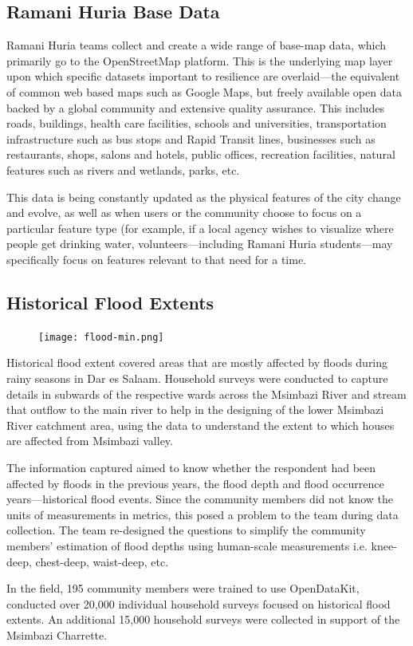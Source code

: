 \documentclass[a4paper,12pt,twoside]{article}
\begin{document}
\subsection{Ramani Huria Base Data}
\begin{multicols}{2}
Ramani Huria teams collect and create a wide range of base-map data, which primarily go to the OpenStreetMap platform. This is the underlying map layer upon which specific datasets important to resilience are overlaid—the equivalent of common web based maps such as Google Maps, but freely available open data backed by a global community and extensive quality assurance. This includes roads, buildings, health care facilities, schools and universities, transportation infrastructure such as bus stops and Rapid Transit lines, businesses such as restaurants, shops, salons and hotels, public offices, recreation facilities, natural features such as rivers and wetlands, parks, etc. 

This data is being constantly updated as the physical features of the city change and evolve, as well as when users or the community choose to focus on a particular feature type (for example, if a local agency wishes to visualize where people get drinking water, volunteers—including Ramani Huria students—may specifically focus on features relevant to that need for a time.
\end{multicols}

\newpage
\subsection{Historical Flood Extents}
\begin{figure}[h]
    \centering
    \texttt{[image: flood-min.png]}
    \label{fig:my_label}
\end{figure}

\begin{multicols}{2}
Historical flood extent covered areas that are mostly affected by floods during rainy seasons in Dar es Salaam. Household surveys were conducted to capture details in subwards of the respective wards across the Msimbazi River and stream that outflow to the main river to help in the designing of the lower Msimbazi River catchment area, using the data to understand the extent to which houses are affected from Msimbazi valley.

The information captured aimed to know whether the respondent had been affected by floods in the previous years, the flood depth and flood occurrence years---historical flood events. Since the community members did not know the units of measurements in metrics, this posed a problem to the team during data collection. The team re-designed the questions to simplify the community members’ estimation of flood depths using human-scale measurements i.e. knee-deep, chest-deep, waist-deep, etc.

In the field, 195 community members were trained to use OpenDataKit, conducted over 20,000 individual household surveys focused on historical flood extents. An additional 15,000 household surveys were collected in support of the Msimbazi Charrette. 
\end{multicols}
\end{document}
